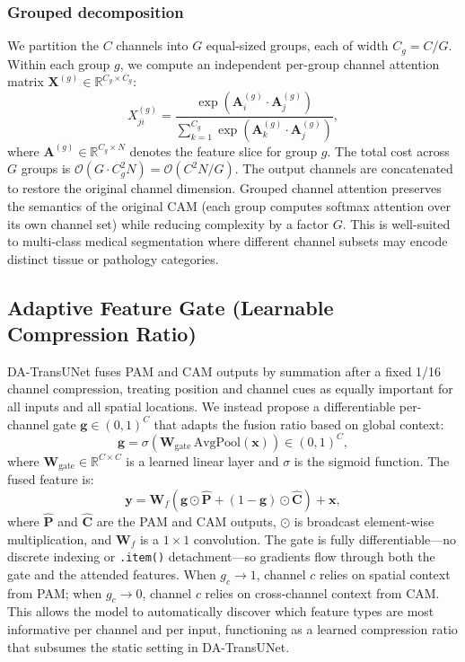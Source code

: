 \documentclass[conference]{IEEEtran}
\begin{document}
\subsubsection{Grouped decomposition}
We partition the $C$ channels into $G$ equal-sized groups, each of width $C_g = C / G$. Within each group $g$, we compute an independent per-group channel attention matrix $\mathbf{X}^{(g)} \in \mathbb{R}^{C_g \times C_g}$:
\begin{equation}
  X^{(g)}_{ji} = \frac{\exp\!\left(\mathbf{A}^{(g)}_i \cdot \mathbf{A}^{(g)}_j\right)}{\sum_{k=1}^{C_g} \exp\!\left(\mathbf{A}^{(g)}_k \cdot \mathbf{A}^{(g)}_j\right)},
  \label{eq:grouped_cam}
\end{equation}
where $\mathbf{A}^{(g)} \in \mathbb{R}^{C_g \times N}$ denotes the feature slice for group $g$. The total cost across $G$ groups is $\mathcal{O}(G \cdot C_g^2 N) = \mathcal{O}(C^2 N / G)$. The output channels are concatenated to restore the original channel dimension. Grouped channel attention preserves the semantics of the original CAM (each group computes softmax attention over its own channel set) while reducing complexity by a factor $G$. This is well-suited to multi-class medical segmentation where different channel subsets may encode distinct tissue or pathology categories.

\subsection{Adaptive Feature Gate (Learnable Compression Ratio)}

DA-TransUNet fuses PAM and CAM outputs by summation after a fixed 1/16 channel compression, treating position and channel cues as equally important for all inputs and all spatial locations. We instead propose a differentiable per-channel gate $\mathbf{g} \in (0, 1)^C$ that adapts the fusion ratio based on global context:
\begin{equation}
  \mathbf{g} = \sigma\!\left(\mathbf{W}_{\text{gate}}\, \text{AvgPool}(\mathbf{x})\right) \in (0, 1)^C,
  \label{eq:gate}
\end{equation}
where $\mathbf{W}_{\text{gate}} \in \mathbb{R}^{C \times C}$ is a learned linear layer and $\sigma$ is the sigmoid function. The fused feature is:
\begin{equation}
  \mathbf{y} = \mathbf{W}_f \!\left(\mathbf{g} \odot \hat{\mathbf{P}} + (1 - \mathbf{g}) \odot \hat{\mathbf{C}}\right) + \mathbf{x},
  \label{eq:fusion}
\end{equation}
where $\hat{\mathbf{P}}$ and $\hat{\mathbf{C}}$ are the PAM and CAM outputs, $\odot$ is broadcast element-wise multiplication, and $\mathbf{W}_f$ is a $1 \times 1$ convolution. The gate is fully differentiable—no discrete indexing or \texttt{.item()} detachment—so gradients flow through both the gate and the attended features. When $g_c \to 1$, channel $c$ relies on spatial context from PAM; when $g_c \to 0$, channel $c$ relies on cross-channel context from CAM. This allows the model to automatically discover which feature types are most informative per channel and per input, functioning as a learned compression ratio that subsumes the static setting in DA-TransUNet.
\end{document}
